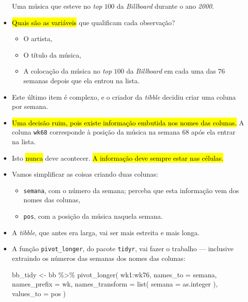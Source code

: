 \documentclass[
  11pt]{report}
\newenvironment{Shaded}{\begin{snugshade}}{\end{snugshade}}
\newcommand{\AttributeTok}[1]{\textcolor[rgb]{0.77,0.63,0.00}{#1}}
\newcommand{\FunctionTok}[1]{\textcolor[rgb]{0.00,0.00,0.00}{#1}}
\newcommand{\NormalTok}[1]{#1}
\newcommand{\OtherTok}[1]{\textcolor[rgb]{0.56,0.35,0.01}{#1}}
\newcommand{\SpecialCharTok}[1]{\textcolor[rgb]{0.00,0.00,0.00}{#1}}
\newcommand{\StringTok}[1]{\textcolor[rgb]{0.31,0.60,0.02}{#1}}
\renewenvironment{Shaded}{
    \begin{mdframed}[%
      roundcorner=2pt,%
      innerleftmargin=5pt,%
      innerrightmargin=5pt,%
      topline=true,%
      leftline=true,%
      rightline=true,%
      bottomline=true,%
      linewidth=0.5pt,%
      linecolor=black!20,%
      backgroundcolor=black!2,%
      skipabove=2ex,%
      skipbelow=2.5ex%
    ]%
  }
  {
    \end{mdframed}
  }
\begin{document}
\begin{itemize}
  Uma música que esteve no \emph{top} $100$ da \emph{Billboard} durante o ano \emph{2000}.
\item
  {\hl{Quais são as variáveis}} que qualificam cada observação?

  \begin{itemize}
  \item
    O artista,
  \item
    O título da música,
  \item
    A colocação da música no \emph{top} $100$ da \emph{Billboard} em cada uma das $76$ semanas depois que ela entrou na lista.
  \end{itemize}
\item
  Este último item é complexo, e o criador da \emph{tibble} decidiu criar uma coluna por semana.
\item
  {\hl{Uma decisão ruim, pois existe informação embutida nos nomes das colunas.}} A coluna \texttt{wk68} corresponde à posição da música na semana $68$ após ela entrar na lista.
\item
  Isto {\hl{nunca}} deve acontecer. {\hl{A informação deve sempre estar nas células.}}
\item
  Vamos simplificar as coisas criando duas colunas:

  \begin{itemize}
  \item
    \texttt{semana}, com o número da semana; perceba que esta informação vem dos nomes das colunas,
  \item
    \texttt{pos}, com a posição da música naquela semana.
  \end{itemize}
\item
  A \emph{tibble}, que antes era larga, vai ser mais estreita e mais longa.
\item
  A função \texttt{pivot\_longer}, do pacote \texttt{tidyr}, vai fazer o trabalho --- inclusive extraindo os números das semanas dos nomes das colunas:

\begin{Shaded}
\begin{Highlighting}[]
\NormalTok{bb\_tidy }\OtherTok{\textless{}{-}}\NormalTok{ bb }\SpecialCharTok{\%\textgreater{}\%} 
  \FunctionTok{pivot\_longer}\NormalTok{(}
\NormalTok{    wk1}\SpecialCharTok{:}\NormalTok{wk76,}
    \AttributeTok{names\_to =} \StringTok{\textquotesingle{}semana\textquotesingle{}}\NormalTok{,}
    \AttributeTok{names\_prefix =} \StringTok{\textquotesingle{}wk\textquotesingle{}}\NormalTok{,}
    \AttributeTok{names\_transform =} \FunctionTok{list}\NormalTok{(}
      \AttributeTok{semana =}\NormalTok{ as.integer}
\NormalTok{    ),}
    \AttributeTok{values\_to =} \StringTok{\textquotesingle{}pos\textquotesingle{}}
\NormalTok{  )}


\end{Highlighting}
\end{Shaded}
\end{itemize}
\end{document}
